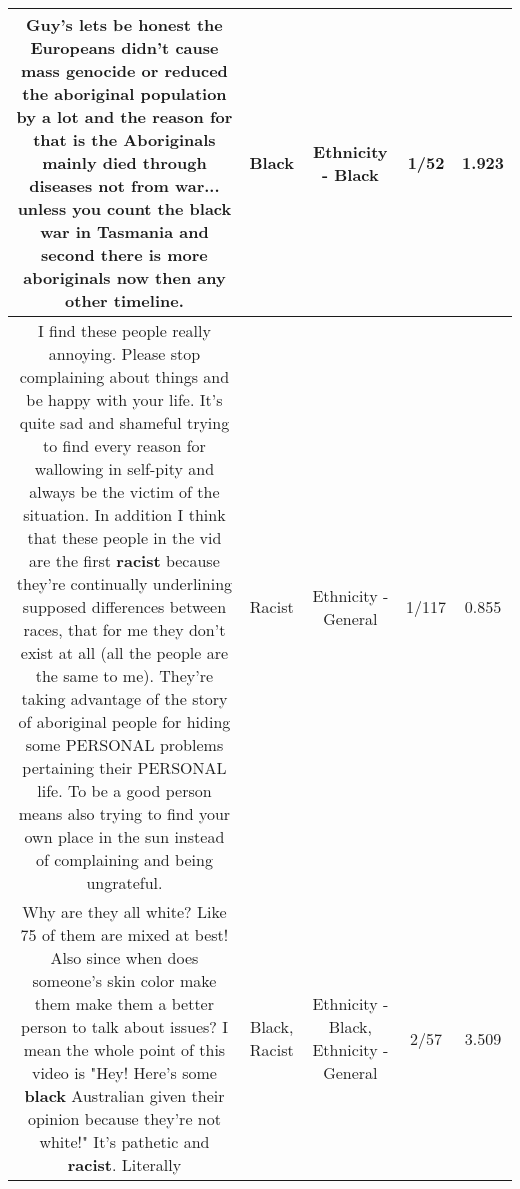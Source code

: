 \documentclass[11pt]{article}
\newlength\mylength
\begin{document}
\begin{center}
\begin{longtable}{|C{.65\mylength}|C{.30\mylength}|C{.12\mylength}|C{.12\mylength}|C{.12\mylength}|}
  \small Guy's lets be honest the Europeans didn't cause mass genocide or reduced the aboriginal population by a lot and the reason for that is the Aboriginals mainly died through diseases not from war... unless you count the \textbf{black} war in Tasmania and second there is more aboriginals now then any other timeline.\normalsize   & Black & Ethnicity - Black & 1/52 & 1.923 \\  \hline
  \small I find these people really annoying. Please stop complaining about things and be happy with your life. It's quite sad and shameful trying to find every reason for wallowing in self-pity and always be the victim of the situation. In addition I think that these people in the vid are the first \textbf{racist} because they're continually underlining supposed differences between races, that for me they don't exist at all (all the people are the same to me). They're taking advantage of the story of aboriginal people for hiding some PERSONAL problems pertaining their PERSONAL life. To be a good person means also trying to find your own place in the sun instead of complaining and being ungrateful.\normalsize   & Racist & Ethnicity - General & 1/117 & 0.855 \\  \hline
  \small Why are they all white? Like 75 of them are mixed at best! Also since when does someone's skin color make them make them a better person to talk about issues? I mean the whole point of this video is "Hey! Here's some \textbf{black} Australian given their opinion because they're not white!" It's pathetic and \textbf{racist}. Literally\normalsize   & Black, Racist & Ethnicity - Black, Ethnicity - General & 2/57 & 3.509 \\  \hline

\end{longtable}
\end{center}
\end{document}
